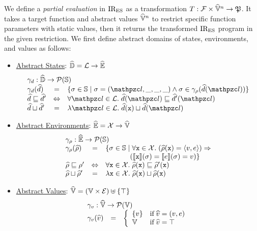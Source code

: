 We define a \textit{partial evaluation} in $\text{IR}_\text{ES}$ as a transformation
$T: \mathcal{F} \times \widehat{\mathbb{V}}^n \rightarrow \mathfrak{P}$.  It takes a
target function and abstract values $\widehat{\mathbb{V}}^n$ to restrict specific function
parameters with static values, then it returns the transformed $\text{IR}_\text{ES}$ program
in the given restriction.  We first define abstract domains of states,
environments, and values as follows:
\begin{itemize}
  \item \underline{Abstract States}: $\widehat{\mathbb{D}} = \mathcal{L} \rightarrow \widehat{\mathbb{E}}$
    \[
      \begin{array}{lcl}
        \multicolumn{3}{l}{\elemgamma: \aelemset \rightarrow \powerset{\stset}}\\
        \elemgamma(\aelem) &=& \{ \st \in \stset \mid \st = (\lab, \_, \_, \_)
        \wedge \st \in \envgamma(\aelem(\lab)) \}\\

        \aelem \order \aelem' &\Leftrightarrow& \forall \lab \in \labset. \;
        \aelem(\lab) \order \aelem'(\lab)\\

        \aelem \join \aelem' &=& \lambda \lab \in \labset. \; \aelem(\varx) \join
        \aelem(\lab)\\
      \end{array}
    \]
  \item \underline{Abstract Environments}: $\widehat{\mathbb{E}} = \mathcal{X} \rightarrow
    \widehat{\mathbb{V}}$
    \[
      \begin{array}{lcl}
        \multicolumn{3}{l}{\envgamma: \aenvset \rightarrow \powerset{\stset}}\\
        \envgamma(\aenv) &=& \{ \st \in \stset \mid \forall \varx \in \varset.
          \; (\aenv(\varx) = \langle \val, \expr \rangle) \Rightarrow\\ &&
          \phantom{\{ \st \in \stset \mid} (\sem{\varx}(\st) = \sem{\expr}(\st) =
          \val) \}\\

        \aenv \order \env' &\Leftrightarrow& \forall \varx \in \varset. \;
        \aenv(\varx) \order \aenv'(\varx)\\

        \aenv \join \aenv' &=& \lambda \varx \in \varset. \; \aenv(\varx) \join
        \aenv(\varx)\\
      \end{array}
    \]
  \item \underline{Abstract Values}: $\widehat{\mathbb{V}} = (\mathbb{V} \times \mathcal{E})
    \uplus \{ \top \}$
    \[
      \begin{array}{lcl}
        \multicolumn{3}{l}{\valgamma: \avalset \rightarrow \powerset{\valset}}\\
        \valgamma(\aval) &=& \left\{
          \begin{array}{ll}
            \{ \val \} & \text{if} \; \aval = (\val, \expr) \\
            \valset & \text{if} \; \aval = \top\\
          \end{array}
        \right.\\


\end{array}\]
\end{itemize}
